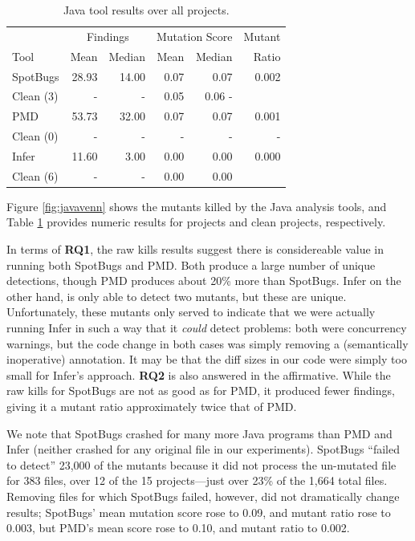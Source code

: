 \begin{table}
  \begin{tabular}{l|r|r|r|r|r}
    & \multicolumn{2}{|c|}{Findings} & \multicolumn{2}{|c|}{Mutation Score}  & Mutant \\
    Tool & Mean & Median & Mean & Median & Ratio\\
    \hline
    \hline
    SpotBugs & 28.93 & 14.00 & 0.07 & 0.07 & 0.002 \\
    Clean (3) & - & - & 0.05 & 0.06 - \\
    \hline
    PMD & 53.73 & 32.00 & 0.07 & 0.07 & 0.001 \\
    Clean (0) & - & - & - & - & - \\
    \hline
    Infer & 11.60 & 3.00 & 0.00 & 0.00 &  0.000 \\
    Clean (6) & - & - & 0.00 & 0.00 \\
    \hline
  \end{tabular}
  \caption{Java tool results over all projects.}
  \label{tab:scorejava}
\end{table}



Figure \ref{fig:javavenn} shows the mutants killed by the Java analysis tools, and Table \ref{tab:scorejava} provides numeric results for projects and clean projects, respectively.

In terms of {\bf RQ1}, the raw kills results suggest there is considereable value in running both SpotBugs and PMD.  Both produce a large number of unique detections, though PMD produces about 20\% more than SpotBugs.
Infer on the other hand, is only able to detect two mutants, but these are unique.  Unfortunately, these mutants only served to indicate that we were actually running Infer in such a way that it \emph{could} detect problems:  both were concurrency warnings, but the code change in both cases was simply removing a (semantically inoperative) {\tt \@Override} annotation.  It may be that the diff sizes in our code were simply too small for Infer's approach.
{\bf RQ2} is also answered in the affirmative.  While the raw kills for SpotBugs are not as good as for PMD, it produced fewer findings, giving it a mutant ratio approximately twice that of PMD.

We note that SpotBugs crashed for many more Java programs than PMD and Infer (neither crashed for any original file in our experiments).  SpotBugs ``failed to detect'' 23,000 of the mutants because it did not process the un-mutated file for 383 files, over 12 of the 15 projects---just over 23\% of the 1,664 total files.  Removing files for which SpotBugs failed, however, did not dramatically change results; SpotBugs' mean mutation score rose to 0.09, and mutant ratio rose to 0.003, but PMD's mean score rose to 0.10, and mutant ratio to 0.002.

